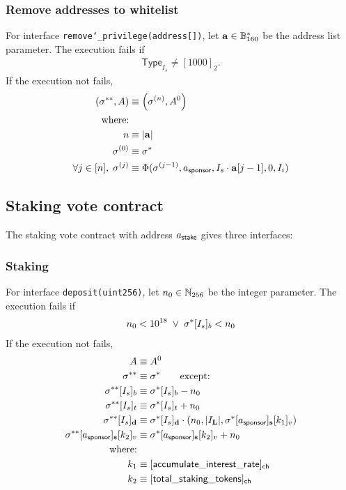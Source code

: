 \subsubsection{Remove addresses to whitelist}

For interface {\tt remove\char`_privilege(address[])}, let $\mathbf{a}\in \mathbb{B}_{160}^*$ be the address list parameter. The execution fails if
 \begin{align}
		\mathsf{Type}_{I_s}\neq[1000]_2. 
	\end{align}
	If the execution not fails, 
	\begin{align}
		\left(\mathbf{\sigma}^{**}, A\right) &\equiv \left(\mathbf{\sigma}^{(n)}, A^0\right)\\ 
		\mbox{where:} &\\
		n&\equiv |\mathbf{a}| \\
		\mathbf{\sigma}^{(0)} &\equiv \mathbf{\sigma}^* \\ 
		\forall j \in [n],\; \mathbf{\sigma}^{(j)} &\equiv \Phi(\mathbf{\sigma}^{(j-1)},a_{\sf sponsor},I_s\cdot {\bf a}[j-1],0,I_i)
    \end{align}
    
\subsection{Staking vote contract}
The staking vote contract with address $a_{\sf stake}$ gives three interfaces:

\subsubsection{Staking}

For interface {\tt deposit(uint256)}, let $n_0\in \mathbb{N}_{256}$ be the integer parameter. The execution fails if 
	\begin{align}
		n_0 < 10^{18} \;\vee\; \mathbf{\sigma}^*[I_s]_b<n_0
	\end{align}
	If the execution not fails, 
	\begin{align}
		A & \eqdef A^0 \\
		\st^{**} &\eqdef \st^* \qquad \mbox{except:}\\
		\st^{**}[I_s]_b &\eqdef \st^*[I_s]_b - n_0\\ 
		\st^{**}[I_s]_t &\eqdef \st^*[I_s]_t + n_0\\ 
		\st^{**}[I_s]_{\bf d} &\eqdef \st^*[I_s]_{\bf d} \cdot (n_0,|I_\mathbf{L}|,\st^*[a_{\sf sponsor}]_{\bf s}[k_1]_v) \\
		\st^{**}[a_{\sf sponsor}]_{\bf s}[k_2]_v & \eqdef\st^*[a_{\sf sponsor}]_{\bf s}[k_2]_v + n_0 \\
		\mbox{where:}& \\
		k_1 & \eqdef [{\sf accumulate\char`_interest\char`_rate}]_{\sf ch} \\
		k_2 & \eqdef [{\sf total\char`_staking\char`_tokens}]_{\sf ch}
    \end{align}
    
